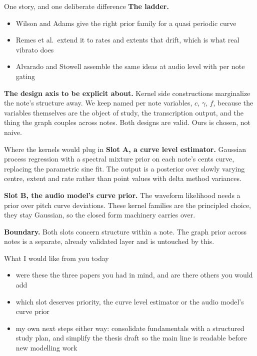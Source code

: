 \documentclass[aspectratio=169,11pt]{beamer}
\begin{document}
\begin{frame}{One story, and one deliberate difference}
  \textbf{The ladder.}
  \begin{itemize}
    \item Wilson and Adams give the right prior family for a quasi
          periodic curve
    \item Remes et al.\ extend it to rates and extents that drift, which
          is what real vibrato does
    \item Alvarado and Stowell assemble the same ideas at audio level
          with per note gating
  \end{itemize}
  \vspace{2mm}
  \textbf{The design axis to be explicit about.} Kernel side
  constructions marginalize the note's structure away. We keep named per
  note variables, $c$, $\gamma$, $f$, because the variables themselves
  are the object of study, the transcription output, and the thing the
  graph couples across notes. Both designs are valid. Ours is chosen,
  not naive.
\end{frame}

\begin{frame}{Where the kernels would plug in}
  \textbf{Slot A, a curve level estimator.} Gaussian process regression
  with a spectral mixture prior on each note's cents curve, replacing
  the parametric sine fit. The output is a posterior over slowly varying
  centre, extent and rate rather than point values with delta method
  variances.
  \vspace{2mm}

  \textbf{Slot B, the audio model's curve prior.} The waveform
  likelihood needs a prior over pitch curve deviations. These kernel
  families are the principled choice, they stay Gaussian, so the closed
  form machinery carries over.
  \vspace{2mm}

  \textbf{Boundary.} Both slots concern structure within a note. The
  graph prior across notes is a separate, already validated layer and is
  untouched by this.
\end{frame}

\begin{frame}{What I would like from you today}
  \begin{itemize}
    \item were these the three papers you had in mind, and are there
          others you would add
    \item which slot deserves priority, the curve level estimator or
          the audio model's curve prior
    \item my own next steps either way: consolidate fundamentals with a
          structured study plan, and simplify the thesis draft so the
          main line is readable before new modelling work
  \end{itemize}
\end{frame}
\end{document}
